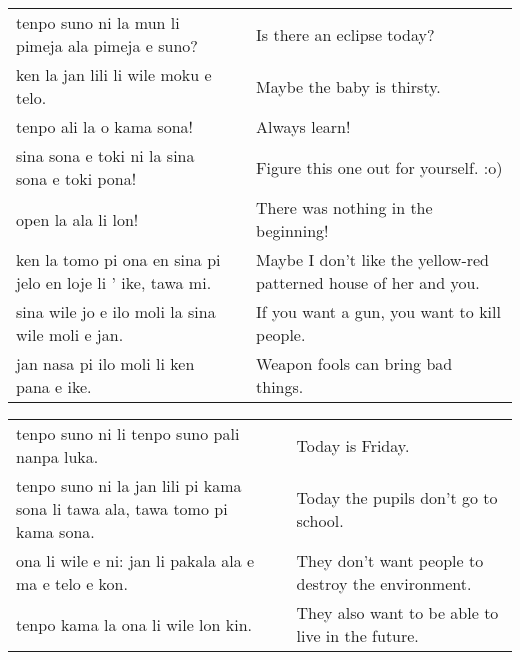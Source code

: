 \begin{supertabular}{p{5,5cm}|ll}
    tenpo suno ni la mun li pimeja ala pimeja e suno?             &  & Is there an eclipse today?                                        \\
    ken la jan lili li wile moku e telo.                          &  & Maybe the baby is thirsty.                                        \\
    tenpo ali la o kama sona!                                     &  & Always learn!                                                     \\
    sina sona e toki ni la sina sona e toki pona!                 &  & Figure this one out for yourself. :o)                             \\
    open la ala li lon!                                           &  & There was nothing in the beginning!                               \\
    ken la tomo pi ona en sina pi jelo en loje li ' ike, tawa mi. &  & Maybe I don't like the yellow-red patterned house of her and you. \\
    sina wile jo e ilo moli la sina wile moli e jan.              &  & If you want a gun, you want to kill people.                       \\
    jan nasa pi ilo moli li ken pana e ike.                       &  & Weapon fools can bring bad things.                                \\
\end{supertabular}

\begin{supertabular}{p{5,5cm}|ll}
    tenpo suno ni li tenpo suno pali nanpa luka.                                &  & Today is Friday.                                   \\
    tenpo suno ni la jan lili pi kama sona li tawa ala, tawa tomo pi kama sona. &  & Today the pupils don't go to school.               \\
    ona li wile e ni: jan li pakala ala e ma e telo e kon.                      &  & They don't want people to destroy the environment. \\
    tenpo kama la ona li wile lon kin.                                          &  & They also want to be able to live in the future.   \\
\end{supertabular}
